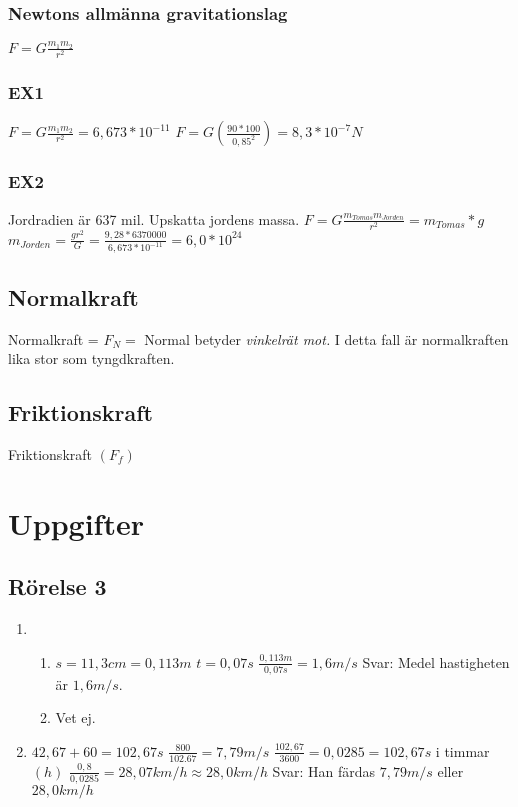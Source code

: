 \documentclass[a4paper,11pt]{article}
\begin{document}
\begin{flushleft}
\subsubsection{Newtons allmänna gravitationslag}
$ F=G\frac{m_1 m_2}{r^2} $
\subsubsection{EX1}
$ F=G\frac{m_1 m_2}{r^2}=6,673*10^{-11} $\newline
$ F=G(\frac{90*100}{0,85^2})=8,3*10^{-7}N $\newline
\subsubsection{EX2}
Jordradien är 637 mil. Upskatta jordens massa.\newline
$ F=G\frac{m_{Tomas} m_{Jorden}}{r^2}=m_{Tomas}*g $\newline
$ m_{Jorden}=\frac{gr^2}{G}=\frac{9,28*6370000}{6,673*10^{-11}}=6,0*10^{24} $
\subsection{Normalkraft}
Normalkraft = $F_N=$\newline
Normal betyder \textit{vinkelrät mot.}\newline
I detta fall är normalkraften lika stor som tyngdkraften.
\subsection{Friktionskraft}
Friktionskraft $( F_f )$\newline
\newpage
\section{Uppgifter}
\subsection{Rörelse 3}
\begin{enumerate}
  \item \begin{enumerate}
    \item $ s=11,3cm=0,113m $\newline
    $ t=0,07s $\newline
    $ \frac{0,113m}{0,07s}=1,6m/s $\newline
    Svar: Medel hastigheten är $ 1,6m/s $.
    \item Vet ej.
  \end{enumerate}
  \item $ 42,67+60=102,67s $\newline
  $ \frac{800}{102.67}=7,79m/s $\newline
  \newline
  $ \frac{102,67}{3600}=0,0285 = 102,67s $ i timmar$(h)$\newline
  \newline
  $ \frac{0,8}{0,0285}=28,07km/h\approx28,0km/h $\newline
  \newline
  Svar: Han färdas $ 7,79m/s $ eller $ 28,0km/h $  
  

\end{enumerate}
\end{flushleft}
\end{document}
